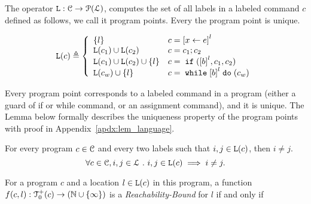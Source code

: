 The operator $\mathtt{L}: \mathcal{C} \to \mathcal{P}(\mathcal{L})$,
computes the set of all labels
in a labeled command $c$ defined as follows, we call it program points.
Every the program point is unique.
\begin{defn}
\label{def:lvar}
{\small
\[
  \lvar(c) \triangleq
  \left\{
  \begin{array}{ll}
      \{l\}                  
      & {c} = \clabel{\assign x e}^{l} 
      \\
      \lvar({c_1}) \cup \lvar({{c_2}}) 
      & {c} = {c_1};{c_2}
      \\
      \lvar(c_1) \cup \lvar({{c_2}}) \cup \{l\} 
      & {c} =\eif(\clabel{\bexpr}^{l}, c_1, c_2) 
      \\
      \lvar(c_w) \cup \{l\} 
      & {c}   = \ewhile \clabel{\bexpr}^{l} \edo (c_w)
\end{array}
\right.
\]
}
\end{defn}
%
Every program point corresponds to a labeled command in a program (either a guard of if or while command, or an assignment command), and it is unique.
The Lemma below formally describes the uniqueness property of the program points
with proof in Appendix~\ref{apdx:lem_language}.
\begin{lem}
  \label{lem:label_unique}
  For every program $c \in \mathcal{C}$ and every two labels such that
  $i, j \in \mathtt{L}(c)$, then $i \neq j$.
  \[
    \forall c \in \mathcal{C}, i, j \in \mathcal{L} ~.~ i, j \in \mathtt{L}(c)\implies i \neq j.
  \]
\end{lem}
%
%
\begin{defn}
  \label{def:rb}
  For a program ${c}$ and a location $l \in \mathtt{L}(c)$ in this program,
a function $f(c, l) : \mathcal{T}^{+}_0(c) \to (\mathbb{N} \cup \{\infty\})$ is a \emph{Reachability-Bound} for $l$ if and only if
\end{defn}
